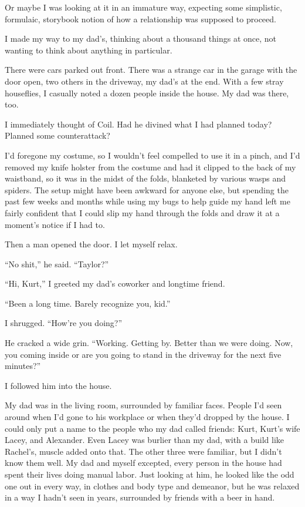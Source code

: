 Or maybe I was looking at it in an immature way, expecting some simplistic, formulaic, storybook notion of how a relationship was supposed to proceed.



I made my way to my dad's, thinking about a thousand things at once, not wanting to think about anything in particular.



There were cars parked out front.  There was a strange car in the garage with the door open, two others in the driveway, my dad's at the end.  With a few stray houseflies, I casually noted a dozen people inside the house.  My dad was there, too.



I immediately thought of Coil.  Had he divined what I had planned today?  Planned some counterattack?



I'd foregone my costume, so I wouldn't feel compelled to use it in a pinch, and I'd removed my knife holster from the costume and had it clipped to the back of my waistband, so it was in the midst of the folds, blanketed by various wasps and spiders.  The setup might have been awkward for anyone else, but spending the past few weeks and months while using my bugs to help guide my hand left me fairly confident that I could slip my hand through the folds and draw it at a moment's notice if I had to.



Then a man opened the door.  I let myself relax.



``No shit,'' he said.  ``Taylor?''



``Hi, Kurt,'' I greeted my dad's coworker and longtime friend.



``Been a long time.  Barely recognize you, kid.''



I shrugged.  ``How're you doing?''



He cracked a wide grin.  ``Working.  Getting by.  Better than we were doing.  Now, you coming inside or are you going to stand in the driveway for the next five minutes?''



I followed him into the house.



My dad was in the living room, surrounded by familiar faces.  People I'd seen around when I'd gone to his workplace or when they'd dropped by the house.  I could only put a name to the people who my dad called friends: Kurt, Kurt's wife Lacey, and Alexander.  Even Lacey was burlier than my dad, with a build like Rachel's, muscle added onto that.  The other three were familiar, but I didn't know them well.  My dad and myself excepted, every person in the house had spent their lives doing manual labor.  Just looking at him, he looked like the odd one out in every way, in clothes and body type and demeanor, but he was relaxed in a way I hadn't seen in years, surrounded by friends with a beer in hand.



